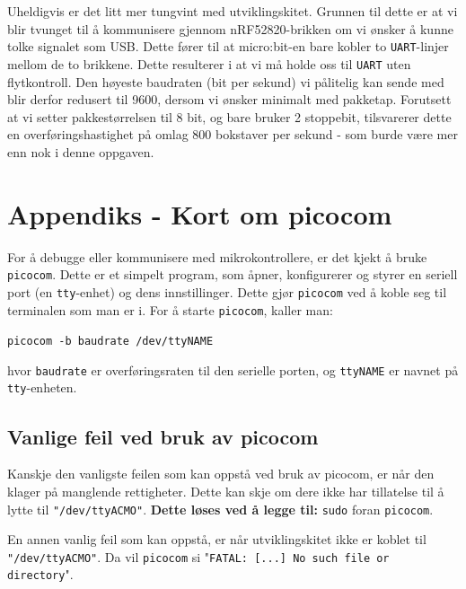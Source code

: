 Uheldigvis er det litt mer tungvint med utviklingskitet. Grunnen til dette er at vi blir tvunget til å kommunisere gjennom nRF52820-brikken om vi ønsker å kunne tolke signalet som USB. Dette fører til at micro:bit-en bare kobler to \verb|UART|-linjer mellom de to brikkene. Dette resulterer i at vi må holde oss til \verb|UART| uten flytkontroll. Den høyeste baudraten (bit per sekund) vi pålitelig kan sende med blir derfor redusert til 9600, dersom vi ønsker minimalt med pakketap. Forutsett at vi setter pakkestørrelsen til 8 bit, og bare bruker 2 stoppebit, tilsvarerer dette en overføringshastighet på omlag 800 bokstaver per sekund - som burde være mer enn nok i denne oppgaven. 


\section{Appendiks - Kort om picocom}\label{app:picocom}

For å debugge eller kommunisere med mikrokontrollere, er det kjekt å bruke \verb|picocom|. Dette er et simpelt program, som åpner, konfigurerer og styrer en seriell port (en \verb|tty|-enhet) og dens innstillinger. Dette gjør \verb|picocom| ved å koble seg til terminalen som man er i. For å starte \verb|picocom|, kaller man:

\verb|picocom -b baudrate /dev/ttyNAME|

hvor \verb|baudrate| er overføringsraten til den serielle porten, og \verb|ttyNAME| er navnet på \verb|tty|-enheten.

\subsection{Vanlige feil ved bruk av picocom}
Kanskje den vanligste feilen som kan oppstå ved bruk av picocom, er når den klager på manglende rettigheter. Dette kan skje om dere ikke har tillatelse til å lytte til \verb|"/dev/ttyACMO"|. \textbf{Dette løses ved å legge til:} \verb|sudo| foran \verb|picocom|.

En annen vanlig feil som kan oppstå, er når utviklingskitet ikke er koblet til \verb|"/dev/ttyACMO"|. Da vil \verb|picocom| si "\verb|FATAL: [...] No such file or directory|".

